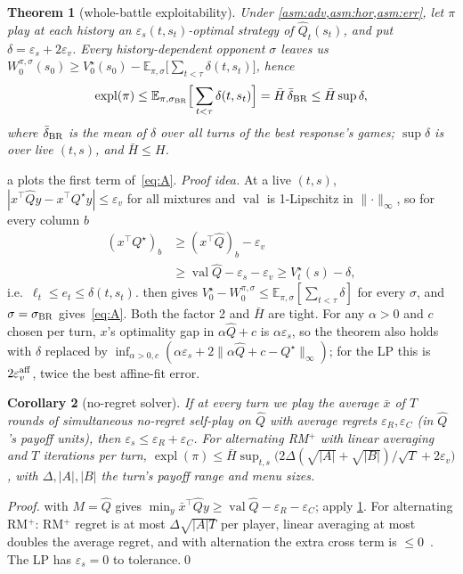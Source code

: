 \documentclass[10pt]{article}
\theoremstyle{tplain}
\newtheorem{theorem}{Theorem}
\newtheorem{corollary}[theorem]{Corollary}
\theoremstyle{tdef}
\theoremstyle{trem}
\newcommand{\E}{\mathbb{E}}
\newcommand{\Hbar}{\bar H}
\newcommand{\epss}{\varepsilon_s}
\newcommand{\epsv}{\varepsilon_v}
\newcommand{\Qhat}{\hat Q}
\newcommand{\Qstar}{Q^\star}
\newcommand{\Vstar}{V^\star}
\DeclareMathOperator{\val}{val}
\DeclareMathOperator{\expl}{expl}
\begin{document}
\begin{theorem}[whole-battle exploitability]\label{thm:A}
Under \cref{asm:adv,asm:hor,asm:err}, let $\pi$ play at each history an $\epss(t,s_t)$-optimal strategy of $\Qhat_t(s_t)$, and put $\delta=\epss+2\epsv$. Every history-dependent opponent $\sigma$ leaves us $W^{\pi,\sigma}_0(s_0)\ge\Vstar_0(s_0)-\E_{\pi,\sigma}\big[\sum_{t<\tau}\delta(t,s_t)\big]$, hence
\begin{equation}\label{eq:A}
\expl(\pi)\le\E_{\pi,\sigma_{\rm BR}}\Big[\sum_{t<\tau}\delta(t,s_t)\Big]=\Hbar\,\bar\delta_{\rm BR}\le\Hbar\sup\delta,
\end{equation}
where $\bar\delta_{\rm BR}$ is the mean of $\delta$ over all turns of the best response's games; $\sup\delta$ is over live $(t,s)$, and $\Hbar\le H$.
\end{theorem}
a plots the first term of~\eqref{eq:A}. \emph{Proof idea.} At a live $(t,s)$, $|x^\top\Qhat y-x^\top\Qstar y|\le\epsv$ for all mixtures and $\val$ is 1-Lipschitz in $\lVert\cdot\rVert_\infty$, so for every column $b$
\begin{align*}
(x^\top\Qstar)_b&\ge(x^\top\Qhat)_b-\epsv\\
&\ge\val\Qhat-\epss-\epsv\ge\Vstar_t(s)-\delta,
\end{align*}
i.e.\ $\ell_t\le e_t\le\delta(t,s_t)$.  then gives $\Vstar_0-W^{\pi,\sigma}_0\le\E_{\pi,\sigma}[\sum_{t<\tau}\delta]$ for every $\sigma$, and $\sigma=\sigma_{\rm BR}$ gives~\eqref{eq:A}. Both the factor 2 and $\Hbar$ are tight. For any $\alpha>0$ and $c$ chosen per turn, $x$'s optimality gap in $\alpha\Qhat+c$ is $\alpha\epss$, so the theorem also holds with $\delta$ replaced by $\inf_{\alpha>0,c}(\alpha\epss+2\lVert\alpha\Qhat+c-\Qstar\rVert_\infty)$; for the LP this is $2\epsv^{\rm aff}$, twice the best affine-fit error.

\begin{corollary}[no-regret solver]\label{cor:solver}
If at every turn we play the average $\bar x$ of $T$ rounds of simultaneous no-regret self-play on $\Qhat$ with average regrets $\varepsilon_R,\varepsilon_C$ (in $\Qhat$'s payoff units), then $\epss\le\varepsilon_R+\varepsilon_C$. For alternating RM$^+$ with linear averaging and $T$ iterations per turn, $\expl(\pi)\le\Hbar\sup_{t,s}\big(2\Delta(\sqrt{|A|}+\sqrt{|B|})/\sqrt T+2\epsv\big)$, with $\Delta,|A|,|B|$ the turn's payoff range and menu sizes.
\end{corollary}
\emph{Proof.}  with $M=\Qhat$ gives $\min_y\bar x^\top\Qhat y\ge\val\Qhat-\varepsilon_R-\varepsilon_C$; apply \cref{thm:A}. For alternating RM$^+$: RM$^+$ regret is at most $\Delta\sqrt{|A|T}$ per player, linear averaging at most doubles the average regret, and with alternation the extra cross term is $\le0$~\cite[Thms.~1, 5, 8]{BMS19}. The LP has $\epss=0$ to tolerance.\qed
\end{document}
